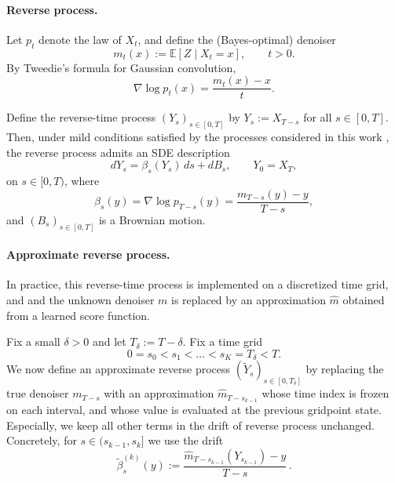 \documentclass[11pt]{article}
\theoremstyle{definition}
\numberwithin{equation}{section}
\begin{document}
\paragraph{Reverse process.}

Let $p_t$ denote the law of $X_t$, and define the (Bayes-optimal) denoiser
\begin{equation*}
m_t(x) := \mathbb{E}[Z\mid X_t=x],\qquad t>0.
\end{equation*}
By Tweedie’s formula for Gaussian convolution,
\begin{equation*}%
\nabla\log p_t(x) = \frac{m_t(x)-x}{t}.
\end{equation*}

Define the reverse-time process $(Y_s)_{s\in[0,T]}$ by $Y_s := X_{T-s}$ for all $s\in[0,T]$. 
Then, under mild conditions satisfied by the processes considered in this work \cite{haussmann1986time}, the reverse process admits an SDE description
\begin{equation*}
dY_s = \beta_s(Y_s)\,ds + dB_s,\qquad
Y_0 = X_{T},
\end{equation*}
on $s\in[0,T)$, where 
\[\beta_s(y) = \nabla\log p_{T-s}(y) = \frac{m_{T-s}(y)-y}{T-s},\]
and $(B_s)_{s\in[0,T]}$ is a Brownian motion. 


\paragraph{Approximate reverse process.}



In practice, this reverse-time process is implemented on a discretized time grid, and and the unknown denoiser $m$ is replaced by an approximation $\hat m$ obtained from a learned score function.

Fix a small $\delta>0$ and let $T_\delta:=T-\delta$.
Fix a time grid
\begin{equation*}
0 = s_0 < s_1 < \dots < s_K = T_\delta < T.
\end{equation*}
We now define an approximate reverse process $(\tilde Y_s)_{s\in[0,T_\delta]}$ by replacing the true denoiser $m_{T-s}$ with an approximation $\hat m_{T-s_{k-1}}$ whose time index is frozen on each interval, and whose value is evaluated at the previous gridpoint state. Especially, we keep all other terms in the drift of reverse process unchanged. Concretely, for $s\in(s_{k-1},s_k]$ we use the drift
\begin{equation*}
\tilde\beta^{(k)}_s(y)
:= \frac{\hat m_{T-s_{k-1}}(Y_{s_{k-1}}) - y}{T-s}\,.
\end{equation*}
\end{document}
